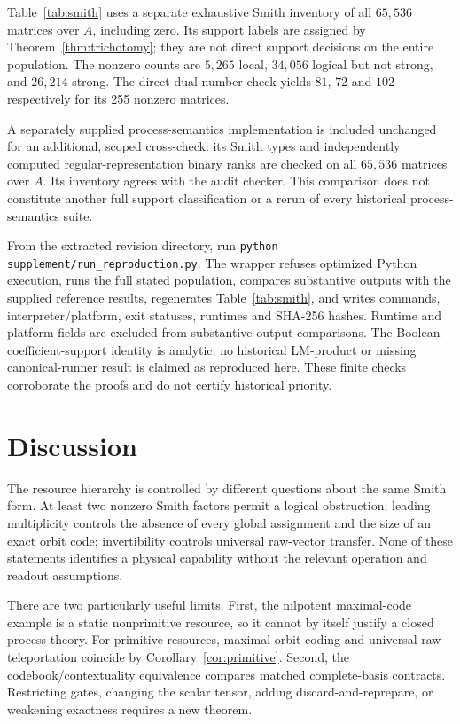 \documentclass[11pt]{article}
\theoremstyle{definition}\newtheorem{definition}[theorem]{Definition}
\theoremstyle{remark}\newtheorem{remark}[theorem]{Remark}
\begin{document}


Table~\ref{tab:smith} uses a separate exhaustive Smith inventory of all $65{,}536$ matrices over $A$, including zero. Its support labels are assigned by Theorem~\ref{thm:trichotomy}; they are not direct support decisions on the entire population. The nonzero counts are $5{,}265$ local, $34{,}056$ logical but not strong, and $26{,}214$ strong. The direct dual-number check yields $81$, $72$ and $102$ respectively for its 255 nonzero matrices.

A separately supplied process-semantics implementation is included unchanged for an additional, scoped cross-check: its Smith types and independently computed regular-representation binary ranks are checked on all $65{,}536$ matrices over $A$. Its inventory agrees with the audit checker. This comparison does not constitute another full support classification or a rerun of every historical process-semantics suite.

From the extracted revision directory, run \texttt{python supplement/run\_reproduction.py}. The wrapper refuses optimized Python execution, runs the full stated population, compares substantive outputs with the supplied reference results, regenerates Table~\ref{tab:smith}, and writes commands, interpreter/platform, exit statuses, runtimes and SHA-256 hashes. Runtime and platform fields are excluded from substantive-output comparisons. The Boolean coefficient-support identity is analytic; no historical LM-product or missing canonical-runner result is claimed as reproduced here. These finite checks corroborate the proofs and do not certify historical priority.

\section{Discussion}
The resource hierarchy is controlled by different questions about the same Smith form. At least two nonzero Smith factors permit a logical obstruction; leading multiplicity controls the absence of every global assignment and the size of an exact orbit code; invertibility controls universal raw-vector transfer. None of these statements identifies a physical capability without the relevant operation and readout assumptions.

There are two particularly useful limits. First, the nilpotent maximal-code example is a static nonprimitive resource, so it cannot by itself justify a closed process theory. For primitive resources, maximal orbit coding and universal raw teleportation coincide by Corollary~\ref{cor:primitive}. Second, the codebook/contextuality equivalence compares matched complete-basis contracts. Restricting gates, changing the scalar tensor, adding discard-and-reprepare, or weakening exactness requires a new theorem.
\end{document}
